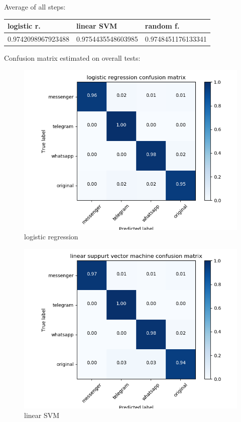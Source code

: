 Average of all steps: 

 {\def\arraystretch{1.3} 
 \begin{table}[H] 
\centering 
\begin{tabular}{|l|l|l|} 
\hline 
logistic r.  &linear SVM  &random f.  \\ \hline
0.9742098967923488  &0.9754435548603985  &0.9748451176133341  \\ \hline
\end{tabular} 
\end{table} }
Confusion matrix estimated on overall tests: 

 \begin{figure}[H] 
\centering 
\includegraphics[scale=.6]{images/logistic_total.png} 
\caption{logistic regression} 
\end{figure} 

 \begin{figure}[H] 
\centering 
\includegraphics[scale=.6]{images/lsvm_total.png} 
\caption{linear SVM} 
\end{figure} 

